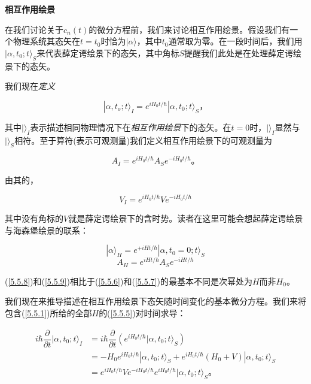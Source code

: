 ﻿\documentclass[UTF8,twoside]{ctexart}
\begin{document}
\noindent \textbf{相互作用绘景}

\noindent 在我们讨论关于$c_n(t)$的微分方程前，我们来讨论相互作用绘景。假设我们有一个物理系统其态矢在$t=t_0$时恰为$|\alpha\rangle$，其中$t_0$通常取为零。在一段时间后，我们用$|\alpha,t_0;t\rangle_S$来代表薛定谔绘景下的态矢，其中角标$S$提醒我们此处是在处理薛定谔绘景下的态矢。

我们现在\emph{定义}

\begin{equation} \label{5.5.5}
|\alpha,t_o;t\rangle_I=e^{iH_0 t/\hbar}|\alpha,t_0;t\rangle_S\text{，}
\end{equation}

\noindent 其中$|\rangle_I$表示描述相同物理情况下在\emph{相互作用绘景}下的态矢。在$t=0$时，$|\rangle_I$显然与$|\rangle_S$相符。至于算符(表示可观测量)我们定义相互作用绘景下的可观测量为

\begin{equation} \label{5.5.6}
A_I=e^{iH_0 t/\hbar}A_S e^{-iH_0 t/\hbar}\text{。}
\end{equation}

\noindent 由其的，

\begin{equation} \label{5.5.7}
V_I=e^{iH_0 t/\hbar}V e^{-iH_0 t/\hbar}
\end{equation}

\noindent 其中没有角标的$V$就是薛定谔绘景下的含时势。读者在这里可能会想起薛定谔绘景与海森堡绘景的联系：

\begin{equation} \label{5.5.8}
|\alpha\rangle_H=e^{+iHt/\hbar}|\alpha,t_0=0;t\rangle_S
\end{equation}
\begin{equation} \label{5.5.9}
A_H=e^{iHt/\hbar}A_S e^{-iHt/\hbar}
\end{equation}

\noindent (\ref{5.5.8})和(\ref{5.5.9})相比于(\ref{5.5.6})和(\ref{5.5.7})的最基本不同是次幂处为$H$而非$H_0$。

我们现在来推导描述在相互作用绘景下态矢随时间变化的基本微分方程。我们来将包含(\ref{5.5.1})所给的全部$H$的(\ref{5.5.5})对时间求导：

\begin{equation} \label{5.5.10}
\begin{split}
i\hbar\dfrac{\partial}{\partial t}|\alpha,t_0;t\rangle_I&=i\hbar\dfrac{\partial}{\partial t}(e^{iH_0 t/\hbar} |\alpha,t_0;t\rangle_S) \\
&=-H_0 e^{iH_0 t/\hbar}|\alpha,t_0;t\rangle_S+e^{iH_0 t/\hbar}(H_0+V)|\alpha,t_0;t\rangle_S \\
&=e^{iH_0 t/\hbar}Ve^{-iH_0 t/\hbar}e^{iH_0 t/\hbar}|\alpha,t_0;t\rangle_S\text{。}
\end{split}
\end{equation}
\end{document}
